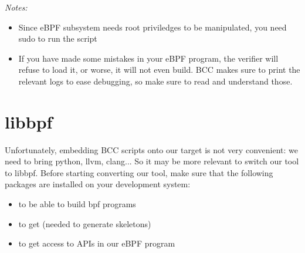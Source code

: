 {\em Notes:
\begin{itemize}
    \item Since eBPF subsystem needs root priviledges to be manipulated, you need sudo to run the script
    \item If you have made some mistakes in your eBPF program, the verifier
    will refuse to load it, or worse, it will not even build. BCC makes sure to
    print the relevant logs to ease debugging, so make sure to read
    and understand those.
\end{itemize}}

\section{libbpf}

Unfortunately, embedding BCC scripts onto our target is not very convenient: we need to bring python, llvm, clang... So it may be more relevant to switch our tool to libbpf. Before starting converting our tool, make sure that the following packages are installed on your development system:
\begin{itemize}
  \item {} to be able to build bpf programs
  \item {} to get  (needed to generate skeletons)
  \item {} to get access to  APIs in our eBPF program
\end{itemize}

